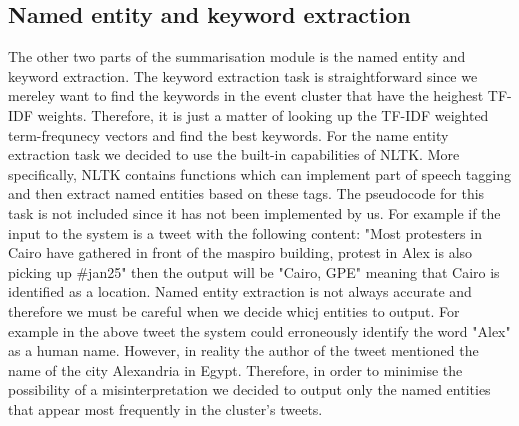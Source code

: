 \subsection{Named entity and keyword extraction}
The other two parts of the summarisation module is the named entity and keyword extraction. The keyword extraction task is straightforward since we mereley want to 
find the keywords in the event cluster that have the heighest TF-IDF weights. Therefore, it is just a matter of looking up the TF-IDF weighted term-frequnecy vectors and 
find the best keywords. For the name entity extraction task we decided to use the built-in capabilities of NLTK. More specifically, NLTK contains functions which can implement part of speech tagging and then extract named entities based on these tags. The pseudocode for this task is not included since it has not been implemented by us. For example if the input to the system is a tweet with the following content: "Most protesters in Cairo have gathered in front of the maspiro building, protest in Alex is also picking up ‪\#jan25" then the output will be "Cairo, GPE" meaning that Cairo is identified as a location. Named entity extraction is not always accurate and therefore we must be careful when we decide whicj entities to output. For example in the above tweet the system could erroneously identify the word "Alex" as a human name. However, in reality the author of the tweet mentioned the name of the city Alexandria in Egypt. Therefore, in order to minimise the possibility of a misinterpretation we decided to output only the named entities that appear most frequently in the cluster's tweets. 

